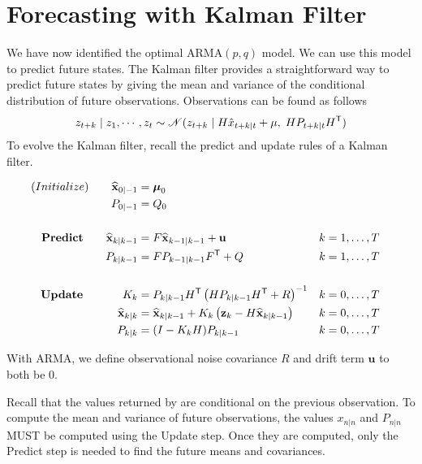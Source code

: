 \section*{Forecasting with Kalman Filter}
We have now identified the optimal ARMA$(p,q)$ model.
We can use this model to predict future states.
The Kalman filter provides a straightforward way to predict future states by giving the mean and variance of the conditional distribution of future observations.
Observations can be found as follows
\begin{align}
    z_{t + k} \mid z_{1}, \cdots, z_{t} \sim \mathscr{N}(z_{t+k} \mid H\hat{x}_{t+k|t} + \mu,\;
    HP_{t+k|t}H^{\mathsf T} )
\end{align}
To evolve the Kalman filter, recall the predict and update rules of a Kalman filter.

\begin{subequations}
    \begin{align*}
        (Initialize) \qquad \widehat{\mathbf{x}}_{0|-1} & = \boldsymbol \mu_0 \\
        \qquad P_{0|-1} & = Q_0 \\
        \vspace{0.2cm} \notag \\
        \textbf{Predict} \qquad \widehat{\mathbf{x}}_{k|k-1} & = F\widehat{\mathbf{x}}_{k-1|k-1} + \mathbf{u} && k = 1, \dots, T \\
        \qquad P_{k|k-1} & = FP_{k-1|k-1}F\trp + Q && k = 1,\dots, T \\
        \vspace{0.2cm} \notag \\
        \textbf{Update} \hspace{1.5em} \qquad K_{k} & = P_{k|k-1}H\trp \left(HP_{k|k-1}H\trp + R\right)^{-1}  && k = 0, \dots, T\\
        \qquad \widehat{\mathbf{x}}_{k|k} & = \widehat{\mathbf{x}}_{k|k-1} + K_{k}\left(\mathbf{z}_{k} - H\widehat{\mathbf{x}}_{k|k-1}\right) && k = 0, \dots, T \\
        \qquad P_{k|k} & = (I - K_{k}H)P_{k|k-1}  && k = 0, \dots, T
    \end{align*}
    \label{eqn:kalman_algorithm}
\end{subequations}

\noindent With ARMA, we define observational noise covariance $R$ and drift term $\mathbf{u}$ to both be 0.

\begin{warn}
Recall that the values returned by  are conditional on the previous observation.
To compute the mean and variance of future observations, the values $x_{n|n}$ and $P_{n|n}$ MUST be computed using the Update step.
Once they are computed, only the Predict step is needed to find the future means and covariances.
\end{warn}

